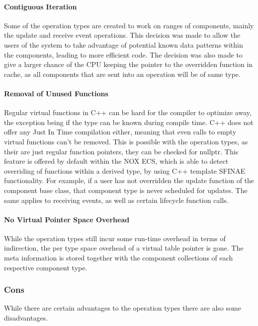 \paragraph{Contiguous Iteration}
Some of the operation types are created to work on ranges of components, mainly the update and receive event operations.
This decision was made to allow the users of the system to take advantage of potential known data patterns within the components,
leading to more efficient code.
The decision was also made to give a larger chance of the CPU keeping the pointer to the overridden function in cache,
as all components that are sent into an operation will be of same type.

\paragraph{Removal of Unused Functions}
Regular virtual functions in C++ can be hard for the compiler to optimize away, the exception
being if the type can be known during compile time. C++ does not offer any Just In Time compilation either,
meaning that even calls to empty virtual functions can't be removed.
This is possible with the operation types, as their are just regular function pointers, they can be checked for nullptr.
This feature is offered by default within the NOX ECS, which is able to detect overriding of functions within a derived type,
by using C++ template SFINAE functionality. 
For example, if a user has not overridden the update function of the component base class, that component type is never scheduled
for updates. The same applies to receiving events, as well as certain lifecycle function calls.

\paragraph{No Virtual Pointer Space Overhead}
While the operation types still incur some run-time overhead in terms of indirection,
the per type space overhead of a virtual table pointer is gone.
The meta information is stored together with the component collections of each respective component type.

\subsubsection{Cons}
While there are certain advantages to the operation types there are also some disadvantages.

